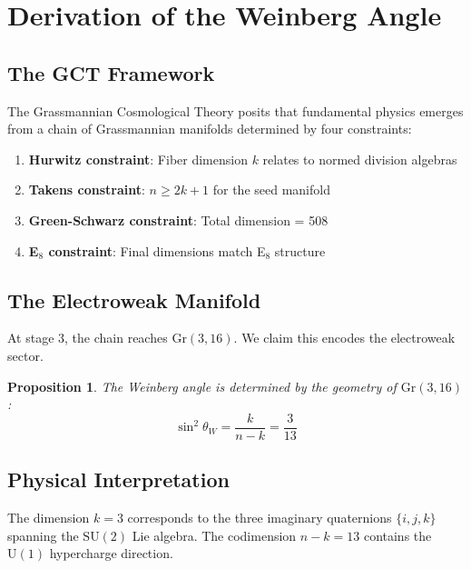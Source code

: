 \documentclass[11pt,a4paper]{article}
\newtheorem{proposition}[theorem]{Proposition}
\newcommand{\Gr}{\mathrm{Gr}}
\begin{document}
\section{Derivation of the Weinberg Angle}

\subsection{The GCT Framework}

The Grassmannian Cosmological Theory posits that fundamental physics emerges from a chain of Grassmannian manifolds determined by four constraints:

\begin{enumerate}
    \item \textbf{Hurwitz constraint}: Fiber dimension $k$ relates to normed division algebras
    \item \textbf{Takens constraint}: $n \geq 2k + 1$ for the seed manifold
    \item \textbf{Green-Schwarz constraint}: Total dimension = 508
    \item \textbf{E$_8$ constraint}: Final dimensions match E$_8$ structure
\end{enumerate}

\subsection{The Electroweak Manifold}

At stage 3, the chain reaches $\Gr(3, 16)$. We claim this encodes the electroweak sector.

\begin{proposition}
The Weinberg angle is determined by the geometry of $\Gr(3, 16)$:
\begin{equation}
    \sin^2\theta_W = \frac{k}{n-k} = \frac{3}{13}
\end{equation}
\end{proposition}

\subsection{Physical Interpretation}

The dimension $k = 3$ corresponds to the three imaginary quaternions $\{i, j, k\}$ spanning the $\mathrm{SU}(2)$ Lie algebra. The codimension $n - k = 13$ contains the $\mathrm{U}(1)$ hypercharge direction.
\end{document}
